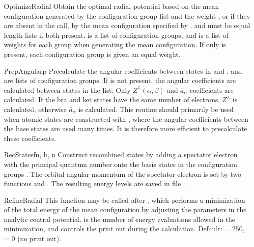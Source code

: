 \begin{fundesc}{OptimizeRadial}{}
Obtain the optimal radial potential based on the mean configuration generated
by the configuration group list  and the weight , or if they are
absent in the call, by the mean configuration specified by .
 and  must be equal length lists if both present. 
is a list of configuration groups, and  is a list of weights for each
group when generating the mean configuration. If only  is present, each
configuration group is given an equal weight.
\end{fundesc}

\begin{fundesc}{PrepAngular}{p}
Precalculate the angular coefficients between states in  and
.  and  are lists of configuration groups. If  is
not present, the angular coefficients are calculated between states in the
 list. Only $Z^L(\alpha,\beta)$ and $\tilde{a_\alpha}$ coefficients are
calculated. If the bra and ket states have the same number of electrons, $Z^L$
is calculated, otherwise $\tilde{a_\alpha}$ is calculated. This routine should
primarily be used when atomic states are constructed with ,
where the angular coefficients between the base states are used many times. It
is therefore more efficient to precalculate these coefficients.
\end{fundesc}

\begin{fundesc}{RecStates}{fn, b, n}
Construct recombined states by adding a spectator electron with the principal
quantum number  onto the basis states in the configuration groups
. The orbital angular momentum of the spectator electron is set by two
functions  and . The resulting
energy levels are saved in file .
\end{fundesc}

\begin{fundesc}{RefineRadial}{}
This function may be called after , which performs a
minimization of the total energy of the mean configuration by adjusting the
parameters in the analytic central potential.  is the number of energy
evaluations allowed in the minimization, and  controls the print out
during the calculation. Default:  = 250,  = 0 (no print out).
\end{fundesc}

